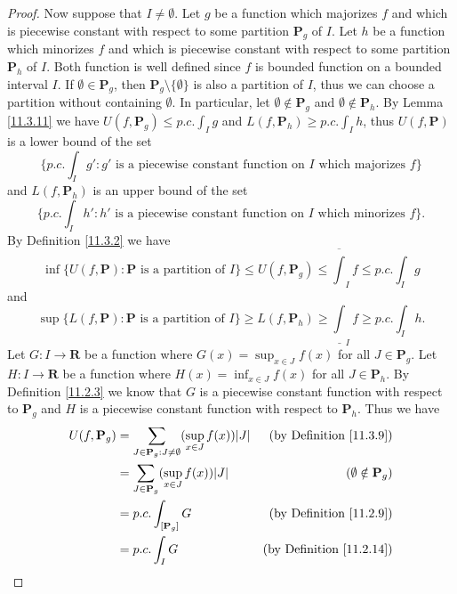 \begin{proof}
    Now suppose that \(I \neq \emptyset\).
    Let \(g\) be a function which majorizes \(f\) and which is piecewise constant with respect to some partition \(\mathbf{P}_g\) of \(I\).
    Let \(h\) be a function which minorizes \(f\) and which is piecewise constant with respect to some partition \(\mathbf{P}_h\) of \(I\).
    Both function is well defined since \(f\) is bounded function on a bounded interval \(I\).
    If \(\emptyset \in \mathbf{P}_g\), then \(\mathbf{P}_g \setminus \{\emptyset\}\) is also a partition of \(I\), thus we can choose a partition without containing \(\emptyset\).
    In particular, let \(\emptyset \notin \mathbf{P}_g\) and \(\emptyset \notin \mathbf{P}_h\).
    By Lemma \ref{11.3.11} we have \(U(f, \mathbf{P}_g) \leq p.c. \int_I g\) and \(L(f, \mathbf{P}_h) \geq p.c. \int_I h\), thus \(U(f, \mathbf{P})\) is a lower bound of the set
    \[
        \{p.c. \int_I g' : g' \text{ is a piecewise constant function on \(I\) which majorizes } f\}
    \]
    and
    \(L(f, \mathbf{P}_h)\) is an upper bound of the set
    \[
        \{p.c. \int_I h' : h' \text{ is a piecewise constant function on \(I\) which minorizes } f\}.
    \]
    By Definition \ref{11.3.2} we have
    \[
        \inf \{U(f, \mathbf{P}) : \mathbf{P} \text{ is a partition of } I\} \leq U(f, \mathbf{P}_g) \leq \overline{\int}_I f \leq p.c. \int_I g
    \]
    and
    \[
        \sup \{L(f, \mathbf{P}) : \mathbf{P} \text{ is a partition of } I\} \geq L(f, \mathbf{P}_h) \geq \underline{\int}_I f \geq p.c. \int_I h.
    \]
    Let \(G : I \to \mathbf{R}\) be a function where \(G(x) = \sup_{x \in J} f(x)\) for all \(J \in \mathbf{P}_g\).
    Let \(H : I \to \mathbf{R}\) be a function where \(H(x) = \inf_{x \in J} f(x)\) for all \(J \in \mathbf{P}_h\).
    By Definition \ref{11.2.3} we know that \(G\) is a piecewise constant function with respect to \(\mathbf{P}_g\) and \(H\) is a piecewise constant function with respect to \(\mathbf{P}_h\).
    Thus we have
    \begin{align*}
        U(f, \mathbf{P}_g) & = \sum_{J \in \mathbf{P}_g : J \neq \emptyset} (\sup_{x \in J} f(x)) \abs*{J} & \text{(by Definition \ref{11.3.9})} \\
        & = \sum_{J \in \mathbf{P}_g} (\sup_{x \in J} f(x)) \abs*{J} & (\emptyset \notin \mathbf{P}_g) \\
        & = p.c. \int_{[\mathbf{P}_g]} G & \text{(by Definition \ref{11.2.9})} \\
        & = p.c. \int_I G & \text{(by Definition \ref{11.2.14})}
    \end{align*}

\end{proof}
